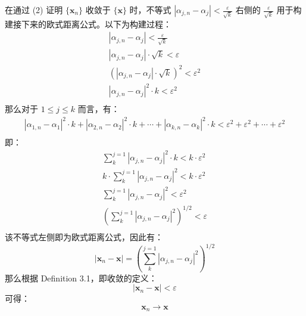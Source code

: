 \documentclass[../poma-notes.tex]{subfiles}
\begin{document}
\begin{anote}
  在通过 (2) 证明 $\{\mathbf{x}_n\}$ 收敛于 $\{\mathbf{x}\}$ 时，不等式 $|\alpha_{j,n} - \alpha_j| < \frac{\varepsilon}{\sqrt{k}}$
  右侧的 $\frac{\varepsilon}{\sqrt{k}}$ 用于构建接下来的欧式距离公式。以下为构建过程：
  \begin{align*}
    |\alpha_{j,n} - \alpha_j| < \frac{\varepsilon}{\sqrt{k}}     \\
    |\alpha_{j,n} - \alpha_j| \cdot \sqrt{k} < \varepsilon       \\
    (|\alpha_{j,n} - \alpha_j| \cdot \sqrt{k})^2 < \varepsilon^2 \\
    |\alpha_{j,n} - \alpha_j|^2 \cdot k < \varepsilon^2          \\
  \end{align*}
  那么对于 $1 \le j \le k$ 而言，有：
  \begin{align*}
    |\alpha_{1,n} - \alpha_1|^2 \cdot k +
    |\alpha_{2,n} - \alpha_2|^2 \cdot k +
    \cdots +
    |\alpha_{k,n} - \alpha_k|^2 \cdot k <
    \varepsilon^2 + \varepsilon^2 + \cdots + \varepsilon^2 \\
  \end{align*}
  即：
  \begin{align*}
    \sum_{k}^{j=1} |\alpha_{j,n} - \alpha_j|^2 \cdot k < k \cdot \varepsilon^2 \\
    k \cdot \sum_{k}^{j=1} |\alpha_{j,n} - \alpha_j|^2 < k \cdot \varepsilon^2 \\
    \sum_{k}^{j=1} |\alpha_{j,n} - \alpha_j|^2 <  \varepsilon^2                \\
    (\sum_{k}^{j=1} |\alpha_{j,n} - \alpha_j|^2)^{1/2} <  \varepsilon          \\
  \end{align*}
  该不等式左侧即为欧式距离公式，因此有：
  \[|\mathbf{x}_n - \mathbf{x}| = (\sum_{k}^{j=1} |\alpha_{j,n} - \alpha_j|^2)^{1/2}\]
  那么根据 Definition 3.1，即收敛的定义：
  \[|\mathbf{x}_n - \mathbf{x}| < \varepsilon \]
  可得：
  \[\mathbf{x}_n \to \mathbf{x}\]
\end{anote}
\end{document}
